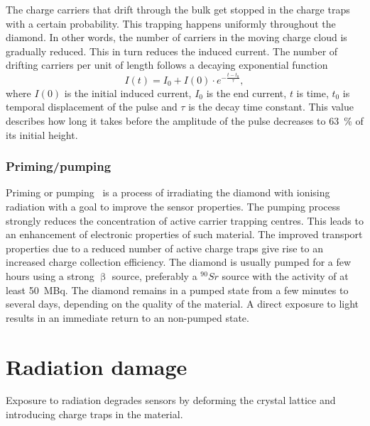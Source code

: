 The charge carriers that drift through the bulk get stopped in the charge traps with a certain probability. This trapping happens uniformly throughout the diamond. In other words, the number of carriers in the moving charge cloud is gradually reduced. This in turn reduces the induced current. The number of drifting carriers per unit of length follows a decaying exponential function
\begin{equation}
\label{eq:decayexp}
I(t)= I_0 + I(0) \cdot e^{-\frac{t-t_0}{\tau} },
\end{equation}
where $I(0)$ is the initial induced current, $I_0$ is the end current, $t$ is time, $t_0$ is temporal displacement of the pulse and $\tau$ is the decay time constant. This value describes how long it takes before the amplitude of the pulse decreases to 63~\% of its initial height.

\subsubsection{Priming/pumping}
Priming or pumping~\cite{pumping:00000} is a process of irradiating the diamond with ionising radiation with a goal to improve the sensor properties. The pumping process strongly reduces the concentration of active carrier trapping centres. This leads to an enhancement of electronic properties of such material. The improved transport properties due to a reduced number of active charge traps give rise to an increased charge collection efficiency. The diamond is usually pumped for a few hours using a strong $\upbeta$ source, preferably a $^{90}Sr$ source with the activity of at least 50~MBq. The diamond remains in a pumped state from a few minutes to several days, depending on the quality of the material. A direct exposure to light results in an immediate return to an non-pumped state.



\section{Radiation damage}
\label{sec:raddam}
Exposure to radiation degrades sensors by deforming the crystal lattice and introducing charge traps in the material. 

